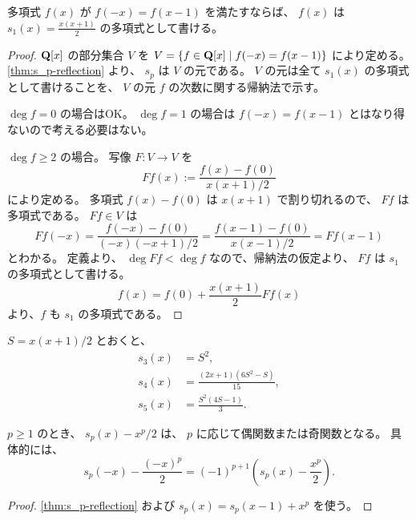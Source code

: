 {\begin{lemma} \label{lem:skew-symmetric-polynomial}
  多項式 $f(x)$ が $f(-x)=f(x-1)$ を満たすならば、 $f(x)$ は $s_1(x)=\frac{x(x+1)}{2}$ の多項式として書ける。
\end{lemma}
\begin{proof}
  $\mathbf{Q}[x]$ の部分集合 $V$ を $V=\{f\in\mathbf{Q}[x]\mid f(-x)=f(x-1)\}$ により定める。
  \autoref{thm:s_p-reflection} より、 $s_p$ は $V$ の元である。
  $V$ の元は全て $s_1(x)$ の多項式として書けることを、 $V$ の元 $f$ の次数に関する帰納法で示す。

  $\deg f=0$ の場合はOK。
  $\deg f=1$ の場合は $f(-x)=f(x-1)$ とはなり得ないので考える必要はない。

  $\deg f\ge 2$ の場合。
  写像 $F\colon V\to V$ を
  \[Ff(x):=\frac{f(x)-f(0)}{x(x+1)/2}\]
  により定める。
  多項式 $f(x)-f(0)$ は $x(x+1)$ で割り切れるので、 $Ff$ は多項式である。
  $Ff\in V$ は
  \[Ff(-x)=\frac{f(-x)-f(0)}{(-x)(-x+1)/2}=\frac{f(x-1)-f(0)}{x(x-1)/2}=Ff(x-1)\]
  とわかる。
  定義より、 $\deg Ff<\deg f$ なので、帰納法の仮定より、 $Ff$ は $s_1$ の多項式として書ける。
  \[f(x)=f(0)+\frac{x(x+1)}{2}Ff(x)\]
  より、$f$ も $s_1$ の多項式である。
\end{proof}

\begin{example*}
  $S=x(x+1)/2$ とおくと、
  \begin{align*}
    s_3(x)&=S^2, \\
    s_4(x)&=\frac{(2x+1)(6S^2-S)}{15}, \\
    s_5(x)&=\frac{S^2(4S-1)}{3}.
  \end{align*}
\end{example*}

\begin{theorem} \label{thm:s_p-minus-half}
  $p\ge 1$ のとき、 $s_p(x)-x^p/2$ は、 $p$ に応じて偶関数または奇関数となる。
  具体的には、
  \[s_p(-x)-\frac{(-x)^p}{2}=(-1)^{p+1}\left(s_p(x)-\frac{x^p}{2}\right).\]
\end{theorem}
\begin{proof}
  \autoref{thm:s_p-reflection} および $s_p(x)=s_p(x-1)+x^p$ を使う。
\end{proof}


}
